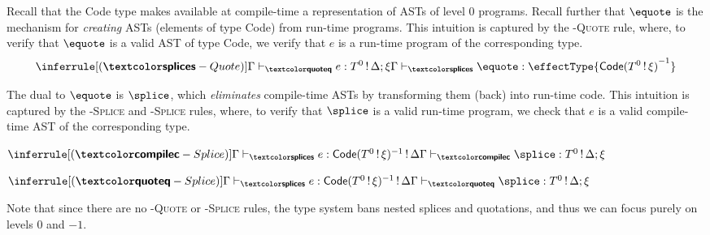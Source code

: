 Recall that the \textsf{Code} type makes available at compile-time a representation of ASTs of level $0$ programs. Recall further that $\equote$ is the mechanism for \textit{creating} ASTs (elements of type \textsf{Code}) from run-time programs. This intuition is captured by the \textsc{\splicemode{}-Quote} rule, where, to verify that $\equote$ is a valid AST of type \textsf{Code}, we verify that $e$ is a run-time program of the corresponding type.
\[\inferrule[(\splicemode{}-Quote)]{\qtypejudge{e}{\runtimecomptype{T}{\Delta ; \xi}}}{\stypejudge{\equote}{\effectType{\compiletimetype{\textsf{Code}(\runtimecomptype{T}{\xi})}}}}\]

The dual to $\equote$ is $\splice$, which \textit{eliminates} compile-time ASTs by transforming them (back) into run-time code. This intuition is captured by the \textsc{\quotemode{}-Splice} and \textsc{\compilemode{}-Splice} rules, where, to verify that $\splice$ is a valid run-time program, we check that $e$ is a valid compile-time AST of the corresponding type. 

\begin{center}
\begin{minipage}[t]{0.5\textwidth}
  \centering
  $\inferrule[(\compilemode{}-Splice)]{\stypejudge[\Gamma]{e}{\textsf{Code}(T^0 \, ! \, \xi)^{-1} \, ! \, \Delta}}{\ctypejudge{\splice}{\runtimecomptype{T}{\Delta ; \xi}}}$
\end{minipage}%
\begin{minipage}[t]{0.5\textwidth}
  \centering
  $\inferrule[(\quotemode{}-Splice)]{\stypejudge[\Gamma]{e}{\textsf{Code}(T^0 \, ! \, \xi)^{-1} \, ! \, \Delta}}{\qtypejudge{\splice}{\runtimecomptype{T}{\Delta ; \xi}}}$
\end{minipage}
\end{center}


Note that since there are no \textsc{\quotemode-Quote} or \textsc{\splicemode-Splice} rules, the type system bans nested splices and quotations, and thus we can focus purely on levels $0$ and $-1$. 

